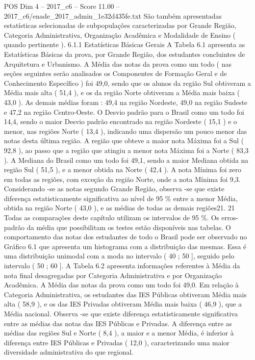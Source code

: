 \begin{textsample}{POS Dim 4 – 2017\_c6 – Score 11.00 – 2017\_c6/enade\_2017\_admin\_1e32d435fe.txt}
São também apresentadas estatísticas selecionadas de subpopulações caracterizadas por Grande Região, Categoria Administrativa, Organização Acadêmica e Modalidade de Ensino ( quando pertinente ). 6.1.1 Estatísticas Básicas Gerais A Tabela 6.1 apresenta as Estatísticas Básicas da prova, por Grande Região, dos estudantes concluintes de Arquitetura e Urbanismo.
A Média das notas da prova como um todo ( nas seções seguintes serão analisados os Componentes de Formação Geral e de Conhecimento Específico ) foi 49,0, sendo que os alunos da região Sul obtiveram a Média mais alta ( 51,4 ), e os da região Norte obtiveram a Média mais baixa ( 43,0 ).
As demais médias foram : 49,4 na região Nordeste, 49,0 na região Sudeste e 47,2 na região Centro-Oeste.
O Desvio padrão para o Brasil como um todo foi 14,4, sendo o maior Desvio padrão encontrado na região Nordeste ( 15,1 ) e o menor, nas regiões Norte ( 13,4 ), indicando uma dispersão um pouco menor das notas desta última região.
A região que obteve a maior nota Máxima foi a Sul ( 92,8 ), ao passo que a região que atingiu a menor nota Máxima foi a Norte ( 83,3 ).
A Mediana do Brasil como um todo foi 49,1, sendo a maior Mediana obtida na região Sul ( 51,5 ), e a menor obtida na Norte ( 42,4 ).
A nota Mínima foi zero em todas as regiões, com exceção da região Norte, onde a nota Mínima foi 9,3.
Considerando -se as notas segundo Grande Região, observa -se que existe diferença estatisticamente significativa ao nível de 95 \% entre a menor Média, obtida na região Norte ( 43,0 ), e as médias de todas as demais regiões21. 21 Todas as comparações deste capítulo utilizam os intervalos de 95 \%.
Os erros-padrão da média que possibilitam os testes estão disponíveis nas tabelas.
O comportamento das notas dos estudantes de todo o Brasil pode ser observado no Gráfico 6.1 que apresenta um histograma com a distribuição das mesmas.
Essa é uma distribuição unimodal com a moda no intervalo ( 40 ; 50 ], seguido pelo intervalo ( 50 ; 60 ].
A Tabela 6.2 apresenta informações referentes à Média da nota final desagregadas por Categoria Administrativa e por Organização Acadêmica.
A Média das notas da prova como um todo foi 49,0.
Em relação à Categoria Administrativa, os estudantes das IES Públicas obtiveram Média mais alta ( 58,9 ), e os das IES Privadas obtiveram Média mais baixa ( 46,9 ), que a Média nacional.
Observa -se que existe diferença estatisticamente significativa entre as médias das notas das IES Públicas e Privadas.
A diferença entre as médias das regiões Sul e Norte ( 8,4 ), a maior e a menor Média, é inferior à diferença entre IES Públicas e Privadas ( 12,0 ), caracterizando uma maior diversidade administrativa do que regional.

\end{textsample}
